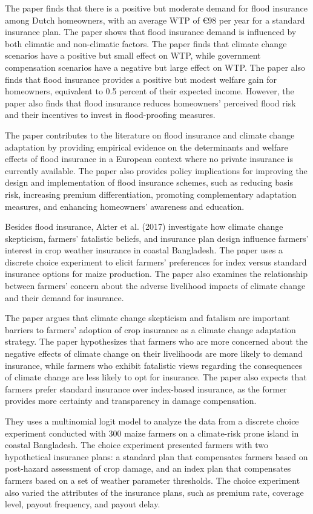 \documentclass[a4paper,12pt]{article}
\begin{document}
The paper finds that there is a positive but moderate demand for flood insurance among Dutch homeowners, with an average WTP of €98 per year for a standard insurance plan. The paper shows that flood insurance demand is influenced by both climatic and non-climatic factors. The paper finds that climate change scenarios have a positive but small effect on WTP, while government compensation scenarios have a negative but large effect on WTP. The paper also finds that flood insurance provides a positive but modest welfare gain for homeowners, equivalent to 0.5 percent of their expected income. However, the paper also finds that flood insurance reduces homeowners’ perceived flood risk and their incentives to invest in flood-proofing measures.

The paper contributes to the literature on flood insurance and climate change adaptation by providing empirical evidence on the determinants and welfare effects of flood insurance in a European context where no private insurance is currently available. The paper also provides policy implications for improving the design and implementation of flood insurance schemes, such as reducing basis risk, increasing premium differentiation, promoting complementary adaptation measures, and enhancing homeowners’ awareness and education.

Besides flood insurance, Akter et al. (2017) investigate how climate change skepticism, farmers’ fatalistic beliefs, and insurance plan design influence farmers’ interest in crop weather insurance in coastal Bangladesh. The paper uses a discrete choice experiment to elicit farmers’ preferences for index versus standard insurance options for maize production. The paper also examines the relationship between farmers’ concern about the adverse livelihood impacts of climate change and their demand for insurance.

The paper argues that climate change skepticism and fatalism are important barriers to farmers’ adoption of crop insurance as a climate change adaptation strategy. The paper hypothesizes that farmers who are more concerned about the negative effects of climate change on their livelihoods are more likely to demand insurance, while farmers who exhibit fatalistic views regarding the consequences of climate change are less likely to opt for insurance. The paper also expects that farmers prefer standard insurance over index-based insurance, as the former provides more certainty and transparency in damage compensation.

They uses a multinomial logit model to analyze the data from a discrete choice experiment conducted with 300 maize farmers on a climate-risk prone island in coastal Bangladesh. The choice experiment presented farmers with two hypothetical insurance plans: a standard plan that compensates farmers based on post-hazard assessment of crop damage, and an index plan that compensates farmers based on a set of weather parameter thresholds. The choice experiment also varied the attributes of the insurance plans, such as premium rate, coverage level, payout frequency, and payout delay.
\end{document}
